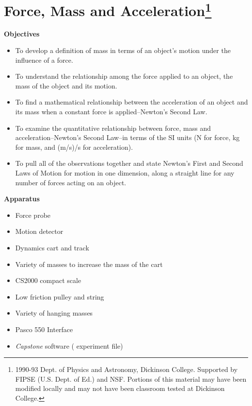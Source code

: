 
\section{Force, Mass and Acceleration\footnote{
1990-93 Dept. of Physics and Astronomy, Dickinson College. Supported by FIPSE
(U.S. Dept. of Ed.) and NSF. Portions of this material may have been modified
locally and may not have been classroom tested at Dickinson College.
}}

\makelabheader %

\bigskip
\textbf{Objectives }

\begin{itemize}
\item To develop a definition of mass in terms of an object's motion under the influence
of a force. 
\item To understand the relationship among the force applied to an object, the mass
of the object and its motion. 
\item To find a mathematical relationship between the acceleration of an object and
its mass when a constant force is applied--Newton's Second Law. 
\item To examine the quantitative relationship between force, mass and acceleration--Newton's
Second Law--in terms of the SI units (N for force, kg for mass, and (m/s)/s for
acceleration). 
\item To pull all of the observations together and state Newton's First and Second
Laws of Motion for motion in one dimension, along a straight line for any number
of forces acting on an object.
\end{itemize}

\bigskip
\textbf{Apparatus }

\begin{itemize}
\item Force probe 
\item Motion detector 
\item Dynamics cart and track 
\item Variety of masses to increase the mass of the cart 
\item CS2000 compact scale
\item Low friction pulley and string 
\item Variety of hanging masses 
\item Pasco 550 Interface
\item \textit{Capstone} software ( experiment file)
\end{itemize}

